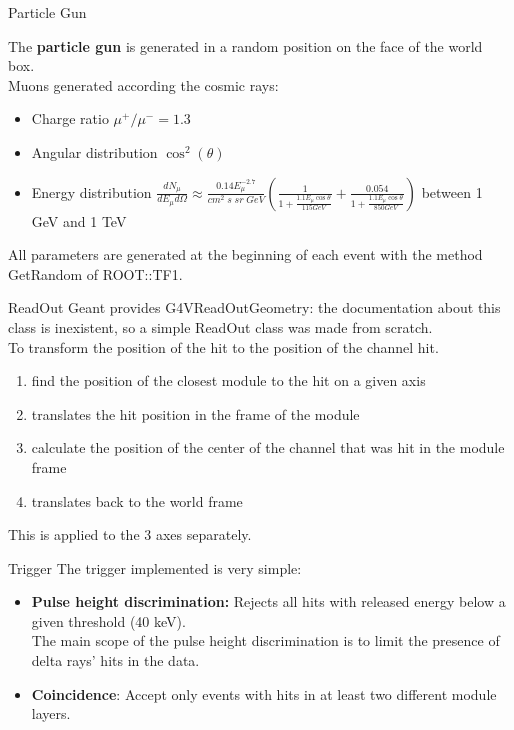 \documentclass[8pt]{beamer}
\begin{document}
\begin{frame}{Particle Gun}

The \textbf{particle gun} is generated in a random position on the face of the world box.\\
Muons generated according the cosmic rays:
\begin{itemize}
    \item Charge ratio $\mu^+/\mu^-=1.3$
    \item Angular distribution $\cos^2(\theta)$
    \item Energy distribution $\frac{dN_{\mu}}{dE_{\mu} d \Omega} \approx \frac{0.14 E_{\mu}^{-2.7}}{cm^2 \; s \;sr \; GeV} \left( \frac{1}{1+\frac{1.1 E_{\mu}\cos{\theta}}{115 GeV}} + \frac{0.054}{1+\frac{1.1 E_{\mu}\cos{\theta}}{850 GeV}} \right)$ between 1 GeV and 1 TeV
\end{itemize}
\vspace{0.6cm}
All parameters are generated at the beginning of each event with the method GetRandom of ROOT::TF1.


\end{frame}

\begin{frame}{ReadOut}
Geant provides G4VReadOutGeometry: the documentation about this class is inexistent, so a simple ReadOut class was made from scratch.\\

\vspace{1cm}
To transform the position of the hit to the position of the channel hit.
\begin{enumerate}
    \item find the position of the closest module to the hit on a given axis
    \item translates the hit position in the frame of the module
    \item calculate the position of the center of the channel that was hit in the module frame
    \item translates back to the world frame
\end{enumerate}
\vspace{0.3cm}
\begin{center}
    This is applied to the 3 axes separately.
\end{center}

\end{frame}

\begin{frame}{Trigger}
  The trigger implemented is very simple:
\begin{itemize}
    \item \textbf{Pulse height discrimination:} Rejects all hits with released energy below a given threshold (40 keV).
    \\
    The main scope of the pulse height discrimination is to limit the presence of delta rays' hits in the data.
    \item \textbf{Coincidence}: Accept only events with hits in at least two different module layers.
\end{itemize}
  
\end{frame}
\end{document}
